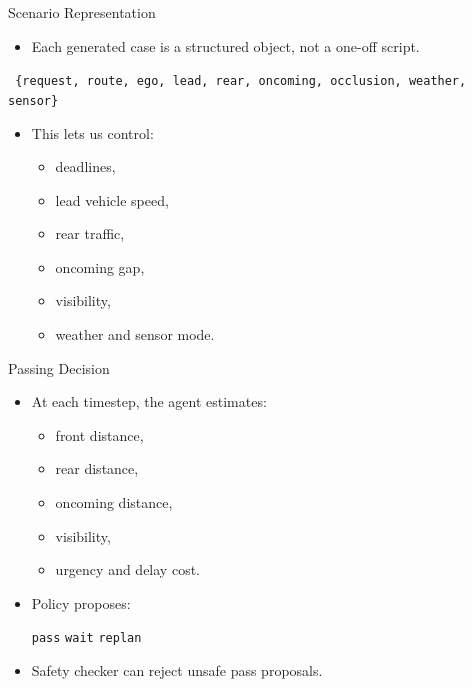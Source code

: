 \documentclass[aspectratio=169,11pt]{beamer}
\begin{document}
\begin{frame}{Scenario Representation}
\begin{itemize}
\item Each generated case is a structured object, not a one-off script.
\end{itemize}

\vspace{8pt}
\begin{center}
\small
\texttt{
\{request, route, ego, lead, rear, oncoming, occlusion, weather, sensor\}
}
\end{center}

\vspace{10pt}

\begin{itemize}
\item This lets us control:
\begin{itemize}
\item deadlines,
\item lead vehicle speed,
\item rear traffic,
\item oncoming gap,
\item visibility,
\item weather and sensor mode.
\end{itemize}
\end{itemize}
\end{frame}

\begin{frame}{Passing Decision}
\begin{itemize}
\item At each timestep, the agent estimates:
\begin{itemize}
\item front distance,
\item rear distance,
\item oncoming distance,
\item visibility,
\item urgency and delay cost.
\end{itemize}

\pause

\item Policy proposes:
\begin{center}
\Large
\texttt{pass} \quad \texttt{wait} \quad \texttt{replan}
\end{center}

\pause

\item Safety checker can reject unsafe pass proposals.
\end{itemize}
\end{frame}
\end{document}
